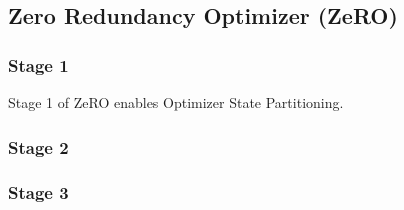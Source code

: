 \subsection{Zero Redundancy Optimizer (ZeRO)}

\subsubsection{Stage 1}

Stage 1 of ZeRO enables Optimizer State Partitioning.

\subsubsection{Stage 2}



\subsubsection{Stage 3}


